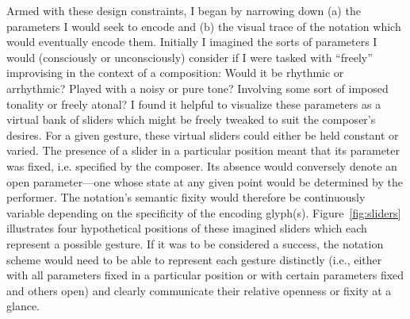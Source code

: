     Armed with these design constraints, I began by narrowing down (a) the parameters I would seek to encode and (b) the visual trace of the notation which would eventually encode them. Initially I imagined the sorts of parameters I would (consciously or unconsciously) consider if I were tasked with ``freely'' improvising in the context of a composition: Would it be rhythmic or arrhythmic? Played with a noisy or pure tone? Involving some sort of imposed tonality or freely atonal? I found it helpful to visualize these parameters as a virtual bank of sliders which might be freely tweaked to suit the composer's desires. For a given gesture, these virtual sliders could either be held constant or varied. The presence of a slider in a particular position meant that its parameter was fixed, i.e. specified by the composer. Its absence would conversely denote an open parameter---one whose state at any given point would be determined by the performer. The notation's semantic fixity would therefore be continuously variable depending on the specificity of the encoding glyph(s). Figure~\ref{fig:sliders} illustrates four hypothetical positions of these imagined sliders which each represent a possible gesture. If it was to be considered a success, the notation scheme would need to be able to represent each gesture distinctly (i.e., either with all parameters fixed in a particular position or with certain parameters fixed and others open) and clearly communicate their relative openness or fixity at a glance.
    

